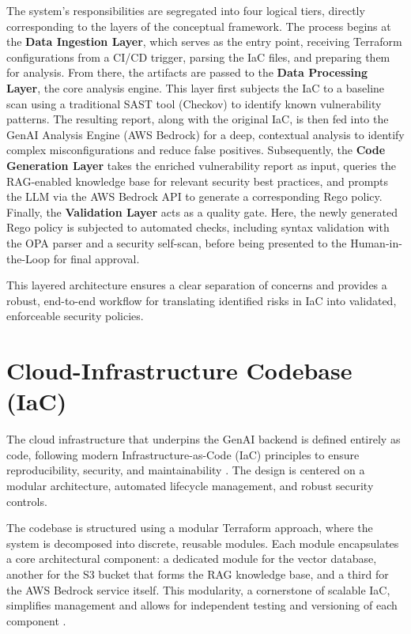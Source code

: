 The system's responsibilities are segregated into four logical tiers, directly corresponding to the layers of the conceptual framework. The process begins at the \textbf{Data Ingestion Layer}, which serves as the entry point, receiving Terraform configurations from a CI/CD trigger, parsing the IaC files, and preparing them for analysis. From there, the artifacts are passed to the \textbf{Data Processing Layer}, the core analysis engine. This layer first subjects the IaC to a baseline scan using a traditional SAST tool (Checkov) to identify known vulnerability patterns. The resulting report, along with the original IaC, is then fed into the GenAI Analysis Engine (AWS Bedrock) for a deep, contextual analysis to identify complex misconfigurations and reduce false positives. Subsequently, the \textbf{Code Generation Layer} takes the enriched vulnerability report as input, queries the RAG-enabled knowledge base for relevant security best practices, and prompts the LLM via the AWS Bedrock API to generate a corresponding Rego policy. Finally, the \textbf{Validation Layer} acts as a quality gate. Here, the newly generated Rego policy is subjected to automated checks, including syntax validation with the OPA parser and a security self-scan, before being presented to the Human-in-the-Loop for final approval.

This layered architecture ensures a clear separation of concerns and provides a robust, end-to-end workflow for translating identified risks in IaC into validated, enforceable security policies.

\section{Cloud-Infrastructure Codebase (IaC)}

The cloud infrastructure that underpins the GenAI backend is defined entirely as code, following modern Infrastructure-as-Code (IaC) principles to ensure reproducibility, security, and maintainability \cite{morris_infrastructure_2016}. The design is centered on a modular architecture, automated lifecycle management, and robust security controls.

The codebase is structured using a modular Terraform approach, where the system is decomposed into discrete, reusable modules. Each module encapsulates a core architectural component: a dedicated module for the vector database, another for the S3 bucket that forms the RAG knowledge base, and a third for the AWS Bedrock service itself. This modularity, a cornerstone of scalable IaC, simplifies management and allows for independent testing and versioning of each component \cite{hashicorp_terraform_2022}.

